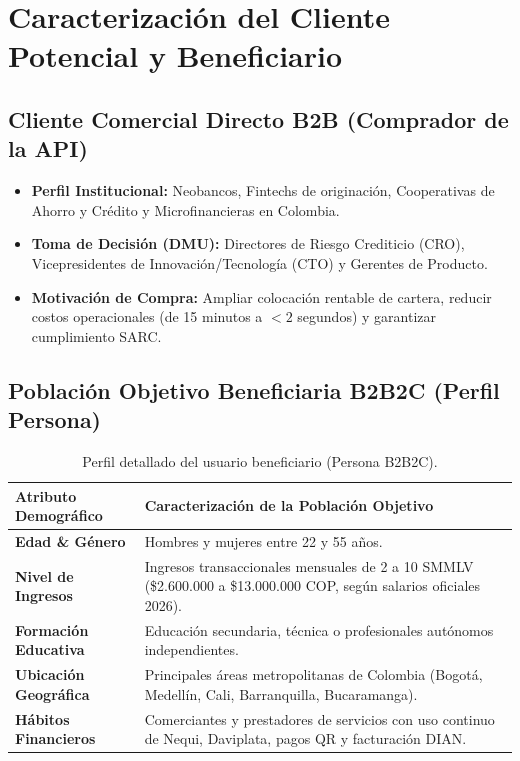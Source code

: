 \documentclass[11pt,a4paper]{article}
\begin{document}
\section{Caracterización del Cliente Potencial y Beneficiario}

\subsection{Cliente Comercial Directo B2B (Comprador de la API)}
\begin{itemize}[leftmargin=*]
    \item \textbf{Perfil Institucional:} Neobancos, Fintechs de originación, Cooperativas de Ahorro y Crédito y Microfinancieras en Colombia.
    \item \textbf{Toma de Decisión (DMU):} Directores de Riesgo Crediticio (CRO), Vicepresidentes de Innovación/Tecnología (CTO) y Gerentes de Producto.
    \item \textbf{Motivación de Compra:} Ampliar colocación rentable de cartera, reducir costos operacionales (de 15 minutos a $<2$ segundos) y garantizar cumplimiento SARC.
\end{itemize}

\subsection{Población Objetivo Beneficiaria B2B2C (Perfil Persona)}
\begin{table}[h!]
\centering
\small
\begin{tabular}{p{4cm} p{11cm}}
\toprule
\textbf{Atributo Demográfico} & \textbf{Caracterización de la Población Objetivo} \\
\midrule
\textbf{Edad \& Género} & Hombres y mujeres entre 22 y 55 años. \\
\midrule
\textbf{Nivel de Ingresos} & Ingresos transaccionales mensuales de 2 a 10 SMMLV (\$2.600.000 a \$13.000.000 COP, según salarios oficiales 2026). \\
\midrule
\textbf{Formación Educativa} & Educación secundaria, técnica o profesionales autónomos independientes. \\
\midrule
\textbf{Ubicación Geográfica} & Principales áreas metropolitanas de Colombia (Bogotá, Medellín, Cali, Barranquilla, Bucaramanga). \\
\midrule
\textbf{Hábitos Financieros} & Comerciantes y prestadores de servicios con uso continuo de Nequi, Daviplata, pagos QR y facturación DIAN. \\
\bottomrule
\end{tabular}
\caption{Perfil detallado del usuario beneficiario (Persona B2B2C).}
\end{table}
\end{document}
